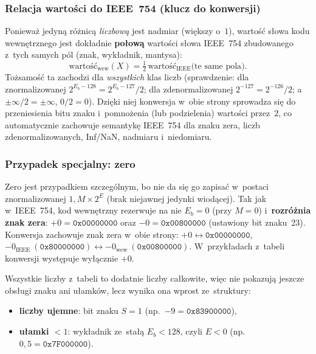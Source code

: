 \documentclass[12pt,a4paper]{article}
\begin{document}
\subsubsection*{Relacja wartości do IEEE~754 (klucz do konwersji)}

Ponieważ jedyną różnicą \emph{liczbową} jest nadmiar (większy o~$1$), wartość
słowa kodu wewnętrznego jest dokładnie \textbf{połową} wartości słowa IEEE~754
zbudowanego z~tych samych pól (znak, wykładnik, mantysa):
\[
  \text{wartość}_{\text{wew}}(X) = \tfrac{1}{2}\,\text{wartość}_{\text{IEEE}}\bigl(\text{te same pola}\bigr).
\]
Tożsamość ta zachodzi dla \emph{wszystkich} klas liczb (sprawdzenie:
dla znormalizowanej $2^{E_b-128} = 2^{E_b-127}/2$; dla zdenormalizowanej
$2^{-127} = 2^{-126}/2$; a~$\pm\infty/2 = \pm\infty$, $0/2 = 0$). Dzięki niej
konwersja w~obie strony sprowadza się do przeniesienia bitu znaku i~pomnożenia
(lub podzielenia) wartości przez~$2$, co automatycznie zachowuje semantykę
IEEE~754 dla znaku zera, liczb zdenormalizowanych, Inf/NaN, nadmiaru i~niedomiaru.

\subsubsection*{Przypadek specjalny: zero}

Zero jest przypadkiem szczególnym, bo nie da się go zapisać w~postaci
znormalizowanej $1{,}M \times 2^E$ (brak niejawnej jedynki wiodącej).
Tak jak w~IEEE~754, kod wewnętrzny rezerwuje na nie $E_b = 0$ (przy $M = 0$)
i~\textbf{rozróżnia znak zera}: $+0 = \texttt{0x00000000}$ oraz
$-0 = \texttt{0x00800000}$ (ustawiony bit znaku~23). Konwersja zachowuje znak
zera w~obie strony: $+0 \leftrightarrow \texttt{0x00000000}$,
$-0_{\text{IEEE}}\ (\texttt{0x80000000}) \leftrightarrow -0_{\text{wew}}\ (\texttt{0x00800000})$.
W~przykładach z~tabeli konwersji występuje wyłącznie $+0$.

Wszystkie liczby z~tabeli to dodatnie liczby całkowite, więc nie pokazują
jeszcze obsługi znaku ani ułamków, lecz wynika ona wprost ze~struktury:
\begin{itemize}
  \item \textbf{liczby ujemne}: bit znaku $S = 1$ (np.\ $-9 = \texttt{0x83900000}$),
  \item \textbf{ułamki $< 1$}: wykładnik ze~stałą $E_b < 128$, czyli $E < 0$
        (np.\ $0{,}5 = \texttt{0x7F000000}$).
\end{itemize}

\end{document}

